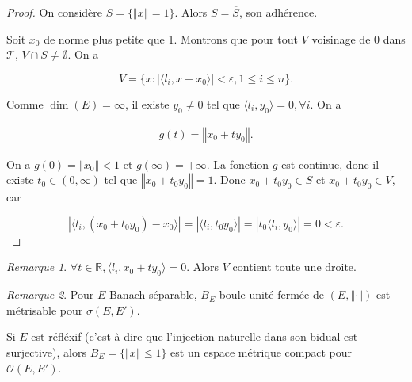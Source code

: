 \documentclass[french]{book}
\theoremstyle{definition}
\theoremstyle{remark}
\newtheorem*{remark}{Remarque}
\newcommand{\lesss}{<}
\newcommand{\less}{\lesss}
\begin{document}
\begin{proof}
  On considère \(S = \{ \left\Vert x \right\Vert =1 \}\). Alors \(S = \overline{S}\), son adhérence.

  Soit \(x_0\) de norme plus petite que 1. Montrons que pour tout \(V\) voisinage de 0 dans \(\mathscr{T}\), \(V \cap S \neq \emptyset\). On a

  \[V = \{ x : \left\lvert \langle l_i,x - x_0 \rangle  \right\rvert \less \varepsilon, 1 \leq i \leq n \}.\]

  Comme \(\operatorname{dim}(E) = \infty\), il existe \(y_0 \neq 0\) tel que \(\langle l_i, y_0 \rangle =0, \forall i\). On a

  \begin{gather*}
    g(t) = \left\Vert x_0 + t y_0 \right\Vert.
  \end{gather*}

  On a \(g(0) = \left\Vert x_0 \right\Vert \less 1\) et \(g(\infty) = +\infty\). La fonction \(g\) est continue, donc il existe \(t_0 \in (0, \infty)\) tel que \(\left\Vert x_0 + t_0 y_0 \right\Vert = 1\). Donc \(x_0 + t_0 y_0 \in S\) et \(x_0 + t_0 y_0 \in V\), car

  \[\left\lvert \langle l_i, (x_0 + t_0 y_0) - x_0 \rangle  \right\rvert = \left\lvert \langle l_i, t_0 y_0 \rangle  \right\rvert = \left\lvert t_0 \langle l_i, y_0 \rangle  \right\rvert = 0 \less \varepsilon.\]
\end{proof}

\begin{remark}
  \(\forall t \in \mathbb{R}, \langle l_i, x_0 + t y_0 \rangle = 0\). Alors \(V\) contient toute une droite.
\end{remark}

\begin{remark}
  Pour \(E\) Banach séparable, \(B_E\) boule unité fermée de \((E,\left\Vert \cdot \right\Vert)\) est métrisable pour \(\sigma(E,E')\).

  Si \(E\) est réfléxif (c'est-à-dire que l'injection naturelle dans son bidual est surjective), alors \(B_E = \{ \left\Vert x \right\Vert \leq 1 \} \) est un espace métrique compact pour \(\mathcal{O}(E, E')\).
\end{remark}
\end{document}
